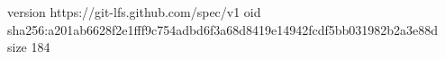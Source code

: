 version https://git-lfs.github.com/spec/v1
oid sha256:a201ab6628f2e1fff9c754adbd6f3a68d8419e14942fcdf5bb031982b2a3e88d
size 184
